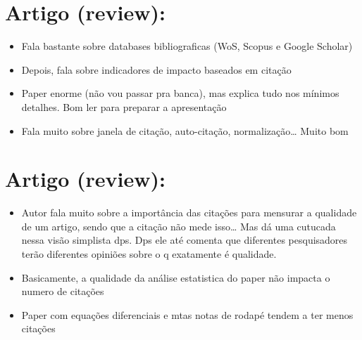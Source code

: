 \documentclass[11pt]{article}
\begin{document}
\section{Artigo (review): \cite{waltman2016}}
\label{sec:org13575d9}
\begin{itemize}
\item Fala bastante sobre databases bibliograficas (WoS, Scopus e Google Scholar)
\item Depois, fala sobre indicadores de impacto baseados em citação
\item Paper enorme (não vou passar pra banca), mas explica tudo nos mínimos detalhes. Bom ler para preparar a apresentação
\item Fala muito sobre janela de citação, auto-citação, normalização\ldots{} Muito bom
\end{itemize}

\section{Artigo (review): \cite{tahamtan2016}}
\label{sec:org010de23}
\begin{itemize}
\item Autor fala muito sobre a importância das citações para mensurar  a qualidade de um artigo, sendo que a citação não mede isso\ldots{} Mas dá uma cutucada nessa visão simplista dps. Dps ele até comenta que diferentes pesquisadores terão diferentes opiniões sobre o q exatamente é qualidade.
\item Basicamente, a qualidade da análise estatistica do paper não impacta o numero de citações
\item Paper com equações diferenciais e mtas notas de rodapé tendem a ter menos citações
\end{itemize}
\end{document}
